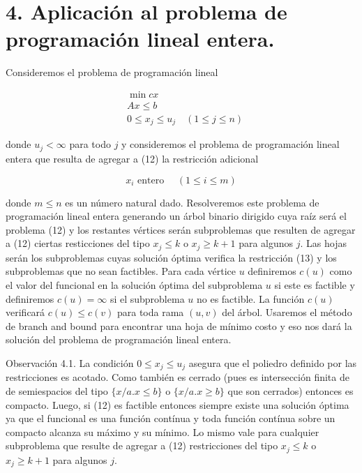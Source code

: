 \documentclass[10pt]{article}
\begin{document}
\section*{4. Aplicación al problema de programación lineal entera.}
Consideremos el problema de programación lineal


\begin{align*}
& \min c x \\
& A x \leq b  \tag{12}\\
& 0 \leq x_{j} \leq u_{j} \quad(1 \leq j \leq n)
\end{align*}


donde $u_{j}<\infty$ para todo $j$ y consideremos el problema de programación lineal entera que resulta de agregar a (12) la restricción adicional


\begin{equation*}
x_{i} \text { entero } \quad(1 \leq i \leq m) \tag{13}
\end{equation*}


donde $m \leq n$ es un número natural dado. Resolveremos este problema de programación lineal entera generando un árbol binario dirigido cuya raíz será el problema (12) y los restantes vértices serán subproblemas que resulten de agregar a (12) ciertas resticciones del tipo $x_{j} \leq k$ o $x_{j} \geq k+1$ para algunos $j$. Las hojas serán los subproblemas cuyas solución óptima verifica la restricción (13) y los subproblemas que no sean factibles. Para cada vértice $u$ definiremos $c(u)$ como el valor del funcional en la solución óptima del subproblema $u$ si este es factible y definiremos $c(u)=\infty$ si el subproblema $u$ no es factible. La función $c(u)$ verificará $c(u) \leq c(v)$ para toda rama $(u, v)$ del árbol. Usaremos el método de branch and bound para encontrar una hoja de mínimo costo y eso nos dará la solución del problema de programación lineal entera.

Observación 4.1. La condición $0 \leq x_{j} \leq u_{j}$ asegura que el poliedro definido por las restricciones es acotado. Como también es cerrado (pues es intersección finita de de semiespacios del tipo $\{x / a . x \leq b\}$ o $\{x / a . x \geq b\}$ que son cerrados) entonces es compacto. Luego, si (12) es factible entonces siempre existe una solución óptima ya que el funcional es una función contínua y toda función contínua sobre un compacto alcanza su máximo y su mínimo. Lo mismo vale para cualquier subproblema que resulte de agregar a (12) restricciones del tipo $x_{j} \leq k$ o $x_{j} \geq k+1$ para algunos $j$.
\end{document}
